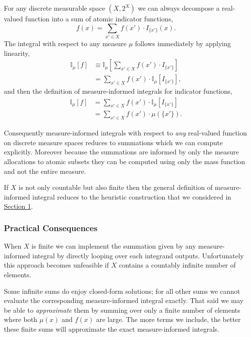 \documentclass[
  letterpaper,
  DIV=11,
  numbers=noendperiod]{scrartcl}
\begin{document}
For any discrete measurable space \((X, 2^{X})\) we can always decompose
a real-valued function into a sum of atomic indicator functions, \[
f(x) = \sum_{x' \in X} f(x') \cdot I_{ \{ x' \} }(x).
\] The integral with respect to any measure \(\mu\) follows immediately
by applying linearity, \begin{align*}
\mathbb{I}_{\mu}[f]
&\equiv
\mathbb{I}_{\mu} \left[ \sum_{x' \in X} f(x') \cdot I_{ \{ x' \} } \right]
\\
&=
\sum_{x' \in X} f(x') \cdot
\mathbb{I}_{\mu} \left[ I_{ \{ x' \} } \right],
\end{align*} and then the definition of measure-informed integrals for
indicator functions, \begin{align*}
\mathbb{I}_{\mu}[f]
&=
\sum_{x' \in X} f(x') \cdot
\mathbb{I}_{\mu} \left[ I_{ \{ x' \} } \right]
\\
&=
\sum_{x' \in X} f(x') \cdot \mu( \{ x' \} ).
\end{align*}

Consequently measure-informed integrals with respect to \emph{any}
real-valued function on discrete measure spaces reduces to summations
which we can compute explicitly. Moreover because the summations are
informed by only the measure allocations to atomic subsets they can be
computed using only the mass function and not the entire measure.

If \(X\) is not only countable but also finite then the general
definition of measure-informed integral reduces to the heuristic
construction that we considered in \href{@finite_expectation}{Section
1}.

\hypertarget{practical-consequences}{%
\subsubsection{Practical Consequences}\label{practical-consequences}}

When \(X\) is finite we can implement the summation given by any
measure-informed integral by directly looping over each integrand
outputs. Unfortunately this approach becomes unfeasible if \(X\)
contains a countably infinite number of elements.

Some infinite sums do enjoy closed-form solutions; for all other sums we
cannot evaluate the corresponding measure-informed integral exactly.
That said we may be able to \emph{approximate} them by summing over only
a finite number of elements where both \(\mu(x)\) and \(f(x)\) are
large. The more terms we include, the better these finite sums will
approximate the exact measure-informed integrals.
\end{document}
